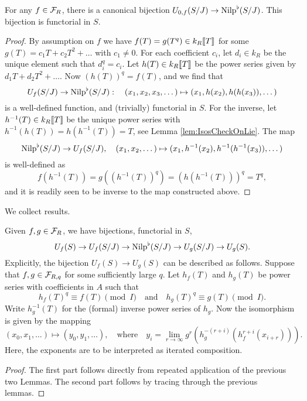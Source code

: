 \documentclass[../main.tex]{subfiles}
\begin{document}
\begin{lem}\label{lem:nilp0iso}
  For any $f \in \mathcal{F}_R$, there is a canonical 
  bijection $U_{0,f}(S/J) \to {\mathrm{Nilp}}^\flat(S/J)$. This bijection is functorial in 
  $S$.
\begin{proof}
  By assumption on $f$ we have $f(T) = g(T^{q}) \in k_R\llbracket T \rrbracket$ for some 
  $g(T) = c_1T + c_2T^2 + \dots$ with $c_1 \neq 0$. For each coefficient $c_i$, let
  $d_i \in k_R$ be the unique element such that $d_i^{q} = c_i$. Let
  $h(T) \in k_R\llbracket T \rrbracket$ be the power series given by $d_1 T + d_2
  T^2 + \dots$. Now $(h(T))^{q}=f(T)$, and we find that 
  \begin{equation*}
      U_f(S/J) \to {\mathrm{Nilp}}^\flat(S/J): \quad
      (x_1, x_2, x_3, \dots) \mapsto (x_1, h(x_2), h(h(x_3)), \dots)
  \end{equation*}
  is a well-defined function, and (trivially) functorial in $S$. For the
  inverse, let $h^{-1}(T) \in k_R\llbracket T \rrbracket$ be the unique power
  series with $h^{-1}(h(T))= h(h^{-1}(T)) = T$, see Lemma
  \ref{lem:IsosCheckOnLie}. The map
  \begin{equation*}
      {\mathrm{Nilp}}^\flat(S/J) \to U_f(S/J), \quad 
      (x_1, x_2, \dots ) \mapsto (x_1, h^{-1}(x_2), h^{-1}(h^{-1}(x_3)), \dots)
  \end{equation*}
  is well-defined as
  \begin{equation*}
      f(h^{-1}(T)) = g((h^{-1}(T))^{q}) = (h(h^{-1}(T)))^{q} =
      T^{q},
  \end{equation*}
  and it is readily seen to be inverse to the map constructed above.
\end{proof}
\end{lem}

We collect results.
\begin{prop}\label{prop:pHTcalc}
  Given $f,g \in \mathcal{F}_R$, we have bijections, functorial in $S$,
  \begin{equation} 
    U_f(S) \to U_f(S/J) \to {\mathrm{Nilp}}^\flat(S/J) \to U_g(S/J) \to U_g(S).
  \end{equation}
  Explicitly, the bijection $U_f(S) \to U_g(S)$ can be described as follows.
  Suppose that $f,g \in \mathcal{F}_{R,q}$ for some sufficiently large $q$. 
  Let $h_f(T)$ and $h_g(T)$ be power series with coefficients in $A$ such that 
  $$h_f(T)^q \equiv f(T) \pmod I\quad\text{and}\quad h_g(T)^q \equiv g(T) \pmod
  I.$$
  Write $h_g^{-1}(T)$ for the (formal) inverse power series of $h_g$. 
  Now the isomorphism is given by the mapping
  \begin{equation*}
    (x_0, x_1, \dots) \mapsto (y_0, y_1, \dots), \quad \text{where} \quad y_i =
    \lim_{r \to \infty} g^r(h_g^{-(r+i)}(h_f^{r+i} (x_{i+r}))).
  \end{equation*}
  Here, the exponents are to be interpreted as iterated composition.
\begin{proof}
  The first part follows directly from repeated application of the previous
  two Lemmas. The second part follows by tracing through the previous lemmas.  
\end{proof}
\end{prop}
\end{document}
